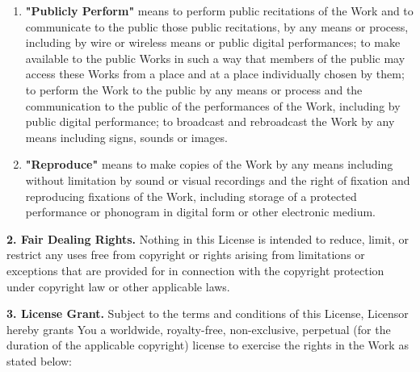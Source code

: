 \begin{enumerate}[noitemsep,label=\alph*.]
      \item \textbf{"Publicly Perform"} means to perform public recitations of the Work and to communicate to the public those public recitations, by any means or process, including by wire or wireless means or public digital performances; to make available to the public Works in such a way that members of the public may access these Works from a place and at a place individually chosen by them; to perform the Work to the public by any means or process and the communication to the public of the performances of the Work, including by public digital performance; to broadcast and rebroadcast the Work by any means including signs, sounds or images.
      
      \item \textbf{"Reproduce"} means to make copies of the Work by any means including without limitation by sound or visual recordings and the right of fixation and reproducing fixations of the Work, including storage of a protected performance or phonogram in digital form or other electronic medium.
    
    \end{enumerate}
    
    \noindent \textbf{2. Fair Dealing Rights.} Nothing in this License is intended to reduce, limit, or restrict any uses free from copyright or rights arising from limitations or exceptions that are provided for in connection with the copyright protection under copyright law or other applicable laws.
    
    \noindent \textbf{3. License Grant.} Subject to the terms and conditions of this License, Licensor hereby grants You a worldwide, royalty-free, non-exclusive, perpetual (for the duration of the applicable copyright) license to exercise the rights in the Work as stated below:
    
